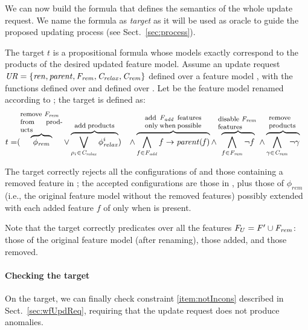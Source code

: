 \begin{tikzborder}{\cite{Gargantini16:validation}}
\begin{tikzborder}{\cite{gargantini_combinatorial_2017}}
\begin{tikzborder}{\cite{gargantini_combinatorial_2017}}
\begin{tikzborder}{\cite{garn2019}}
\begin{tikzborder}{\cite{arcaini2019achieving}}
	We can now build the formula that defines the semantics of the whole update request. We name the formula as {\it target} as it will be used as oracle to guide the proposed updating process (see Sect.~\ref{sec:process}).\be
	
	\begin{mydef}\label{def:target}
		\bb The target $t$ is a propositional formula whose models exactly correspond to the products of the desired updated feature model. Assume an update request $\mathit{UR} = \{\mathit{ren}, \mathit{parent}, \mathit{F_{rem}}, \mathit{C_{relax}}, \mathit{C_{rem}}{}\}$ defined over a feature model \fm, with the functions \rename defined over \Ftbr and \parentna defined over \Fadd. Let \fmrenamed be the feature model renamed according to \rename; the target is defined as:\be
		\begin{align*} 
		t = & (\overbrace{\;\phi_{\mathit{rem}}\;}^{\parbox{18mm}{\footnotesize remove \Frem\\from products}} \vee \overbrace{\bigvee_{\rho_i \in \CFrelax} \phi^i_{\mathit{relax}}}^{\parbox{17mm}{\footnotesize add products}}) & \wedge
		& \overbrace{\bigwedge_{f \in \Fadd} f \rightarrow \parent{f}}^{\parbox{24mm}{\footnotesize add \Fadd features only when possible}} \wedge \overbrace{\bigwedge_{f \in \Frem} \neg f}^{\parbox{17mm}{\footnotesize disable \Frem\\ features}} \wedge \overbrace{\bigwedge_{\gamma \in \CFrem} \neg \gamma}^{\parbox{12mm}{\footnotesize remove products}}
		\end{align*}
	\end{mydef}
	
	\bb The target correctly rejects all the configurations of \CFrem and those containing a removed feature in \Frem; the accepted configurations are those in \CFrelax, plus those of $\phi_{\mathit{rem}}$ (i.e., the original feature model without the removed features) possibly extended with each added feature $f$ of \Fadd only when  is present.
	
	Note that the target correctly predicates over all the features $F_U = F^\prime \cup \mathit{F_{rem}}$: those of the original feature model (after renaming), those added, and those removed.\be
	
	\paragraph{Checking the target}
	
	\bb On the target, we can finally check constraint \ref{item:notIncons} described in Sect.~\ref{sec:wfUpdReq}, requiring that the update request does not produce anomalies.
	

\end{tikzborder}
\end{tikzborder}
\end{tikzborder}
\end{tikzborder}
\end{tikzborder}
